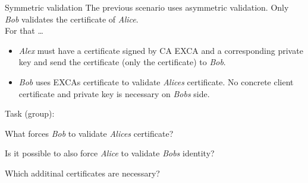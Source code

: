 ﻿\begin{frame}{Symmetric validation}
    The \alert{previous scenario} uses \alert{asymmetric validation}. Only \textit{Bob} validates the certificate of \textit{Alice}.\\
    For that \ldots
    \begin{itemize}
        \item \alert{\textit{Alex} must have a certificate signed by CA EXCA} and a corresponding \alert{private key} and \alert{send the certificate} (only the certificate) to \textit{Bob}.
        \item \textit{Bob} \alert{uses EXCAs certificate} to validate \textit{Alices} certificate. \alert{No concrete} client certificate and private key is necessary on \textit{Bobs} side.
    \end{itemize}
    \begin{exampleblock}{Task (group):}
        \begin{description}[???]
            \item [???] What forces \textit{Bob} to \alert{validate} \textit{Alices} certificate?
            \item [???] Is it possible to also force \textit{Alice} to validate \textit{Bobs} identity?
            \item [???] Which additinal certificates are necessary?
        \end{description}
    \end{exampleblock}
\end{frame}
